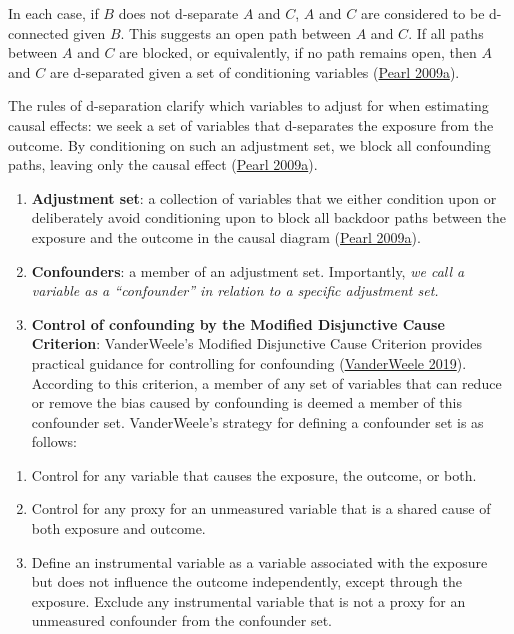 \documentclass[
  singlecolumn]{article}
\providecommand{\tightlist}{%
  \setlength{\itemsep}{0pt}\setlength{\parskip}{0pt}}\usepackage{longtable,booktabs,array}
\begin{document}
In each case, if \(B\) does not d-separate \(A\) and \(C\), \(A\) and
\(C\) are considered to be d-connected given \(B\). This suggests an
open path between \(A\) and \(C\). If all paths between \(A\) and \(C\)
are blocked, or equivalently, if no path remains open, then \(A\) and
\(C\) are d-separated given a set of conditioning variables
(\protect\hyperlink{ref-pearl2009}{Pearl 2009a}).

The rules of d-separation clarify which variables to adjust for when
estimating causal effects: we seek a set of variables that d-separates
the exposure from the outcome. By conditioning on such an adjustment
set, we block all confounding paths, leaving only the causal effect
(\protect\hyperlink{ref-pearl2009}{Pearl 2009a}).

\begin{enumerate}
\def\labelenumi{\arabic{enumi}.}
\setcounter{enumi}{4}
\item
  \textbf{Adjustment set}: a collection of variables that we either
  condition upon or deliberately avoid conditioning upon to block all
  backdoor paths between the exposure and the outcome in the causal
  diagram (\protect\hyperlink{ref-pearl2009}{Pearl 2009a}).
\item
  \textbf{Confounders}: a member of an adjustment set. Importantly,
  \emph{we call a variable as a ``confounder'' in relation to a specific
  adjustment set.}
\item
  \textbf{Control of confounding by the Modified Disjunctive Cause
  Criterion}: VanderWeele's Modified Disjunctive Cause Criterion
  provides practical guidance for controlling for confounding
  (\protect\hyperlink{ref-vanderweele2019}{VanderWeele 2019}). According
  to this criterion, a member of any set of variables that can reduce or
  remove the bias caused by confounding is deemed a member of this
  confounder set. VanderWeele's strategy for defining a confounder set
  is as follows:
\end{enumerate}

\begin{enumerate}
\def\labelenumi{\alph{enumi}.}
\tightlist
\item
  Control for any variable that causes the exposure, the outcome, or
  both.
\item
  Control for any proxy for an unmeasured variable that is a shared
  cause of both exposure and outcome.
\item
  Define an instrumental variable as a variable associated with the
  exposure but does not influence the outcome independently, except
  through the exposure. Exclude any instrumental variable that is not a
  proxy for an unmeasured confounder from the confounder set.
\end{enumerate}
\end{document}
